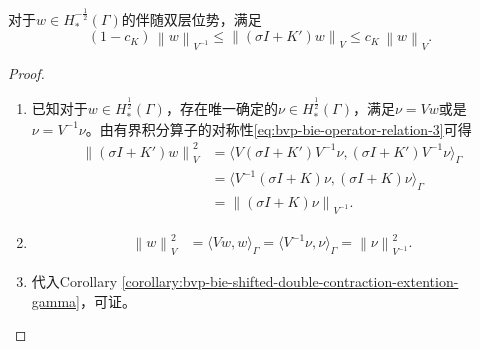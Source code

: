 \begin{corollary}[伴随双层位势的收缩属性]
  \label{corollary:bvp-bie-adjoint-double-contraction-property}
  对于$w \in H_{*}^{-\frac{1}{2}}(\Gamma)$的伴随双层位势，满足
  \begin{equation}
  \label{eq:bvp-bie-adjoint-double-contraction-property}
  \left( 1 - c_{K} \right) \,
  \left\| w \right\|_{V^{-1}}
  \le
  \left\| \left( \sigma I + K' \right) w
  \right\|_{V}
  \le c_{K} \, \left\| w \right\|_{V}.
  \end{equation}
\end{corollary}
\begin{proof}
  \begin{enumerate}

  \item 已知对于$w \in H_{*}^{\frac{1}{2}}(\Gamma)$，存在唯一确定的$\nu \in H_{*}^{\frac{1}{2}}(\Gamma)$，满足$\nu = V w $或是$\nu = V^{-1} \nu$。由有界积分算子的对称性\eqref{eq:bvp-bie-operator-relation-3}可得
  \begin{equation*}
    \begin{split}
      \left\| \left( \sigma I + K' \right) w \right\|_{V}^{2}
      & = \langle
      V \left( \sigma I + K' \right) V^{-1} \nu,
      \left( \sigma I + K' \right) V^{-1} \nu
      \rangle_{\Gamma} \\
      & =
      \langle
      V^{-1} \left( \sigma I + K \right) \nu,
      \left( \sigma I + K \right) \nu
      \rangle_{\Gamma} \\
      & = \left\|
      \left( \sigma I + K \right) \nu
      \right\|_{V^{-1}}.
    \end{split}
  \end{equation*}
\item
\begin{equation*}
\begin{split}
  \left\| w \right\|_{V}^{2}
  & = \langle V w, w \rangle_{\Gamma}
  = \langle V^{-1} \nu, \nu \rangle_{\Gamma}
  = \left\| \nu \right\|_{V^{-1}}^{2}.
\end{split}
\end{equation*}
\item 代入Corollary \ref{corollary:bvp-bie-shifted-double-contraction-extention-gamma}，可证。
  \end{enumerate}
\end{proof}


